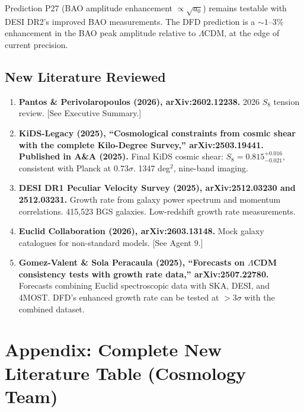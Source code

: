 \documentclass[11pt]{article}
\newcommand{\LCDM}{$\Lambda$CDM}
\newcommand{\aM}{a_0}
\begin{document}
Prediction P27 (BAO amplitude enhancement $\propto \sqrt{\aM}$)
remains testable with DESI DR2's improved BAO measurements. The
DFD prediction is a $\sim 1$--3\% enhancement in the BAO peak
amplitude relative to \LCDM, at the edge of current precision.

\subsection{New Literature Reviewed}

\begin{tcolorbox}[colback=green!5!white, colframe=green!50!black,
  title=\textbf{Agent 12: NEW LITERATURE REVIEWED}]

\begin{enumerate}

\item \textbf{Pantos \& Perivolaropoulos (2026), arXiv:2602.12238.}
  2026 $S_8$ tension review. [See Executive Summary.]

\item \textbf{KiDS-Legacy (2025), ``Cosmological constraints from
  cosmic shear with the complete Kilo-Degree Survey,''
  arXiv:2503.19441. Published in A\&A (2025).}
  Final KiDS cosmic shear: $S_8 = 0.815^{+0.016}_{-0.021}$,
  consistent with Planck at $0.73\sigma$. 1347 deg$^2$, nine-band
  imaging.

\item \textbf{DESI DR1 Peculiar Velocity Survey (2025),
  arXiv:2512.03230 and 2512.03231.}
  Growth rate from galaxy power spectrum and momentum correlations.
  415,523 BGS galaxies. Low-redshift growth rate measurements.

\item \textbf{Euclid Collaboration (2026), arXiv:2603.13148.}
  Mock galaxy catalogues for non-standard models. [See Agent 9.]

\item \textbf{Gomez-Valent \& Sola Peracaula (2025),
  ``Forecasts on $\Lambda$CDM consistency tests with growth rate
  data,'' arXiv:2507.22780.}
  Forecasts combining Euclid spectroscopic data with SKA, DESI, and
  4MOST. DFD's enhanced growth rate can be tested at $> 3\sigma$
  with the combined dataset.

\end{enumerate}
\end{tcolorbox}


\section{Appendix: Complete New Literature Table (Cosmology Team)}
\end{document}
